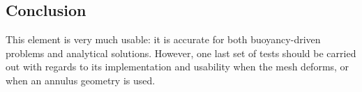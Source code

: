 \subsection*{Conclusion}

This element is very much usable: it is accurate for both buoyancy-driven problems and 
analytical solutions. 
However, one last set of tests should be carried out with regards to its implementation 
and usability when the mesh deforms, or when an annulus geometry is used.
